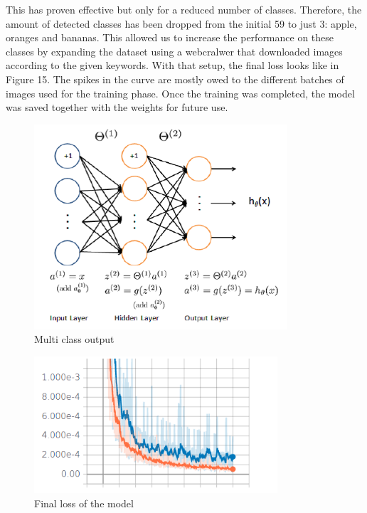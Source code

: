 \documentclass[a4paper,11pt]{article}
\begin{document}
	  This has proven effective but only for a reduced number of classes. Therefore, the amount of detected classes has been dropped from the initial 59 to just 3: apple, oranges and bananas. This allowed us to increase the performance on these classes by expanding the dataset using a webcralwer that downloaded images according to the given keywords. With that setup, the final loss looks like in Figure 15. The spikes in the curve are mostly owed to the different batches of images used for the training phase. Once the training was completed, the model was saved together with the weights for future use.
	  
	   \begin{figure}[H]
	   	\includegraphics[height=3in]{multiclass.png}
	   	\caption{Multi class output}
	   \end{figure}
	  
	  	  
	  	  \begin{figure}[H]
	  	  	\includegraphics[height=2in]{loss.png}
	  	  	\caption{Final loss of the model}
	  	  \end{figure}
\end{document}
